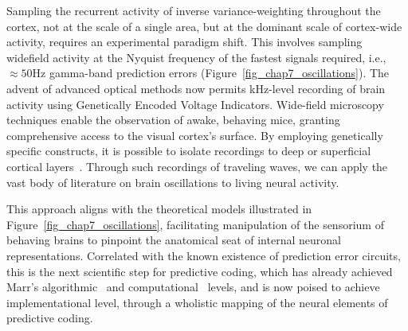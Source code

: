 Sampling the recurrent activity of inverse variance-weighting throughout the cortex, not at the scale of a single area, but at the dominant scale of cortex-wide activity, requires an experimental paradigm shift. This involves sampling widefield activity at the Nyquist frequency of the fastest signals required, i.e., $\approx 50$Hz gamma-band prediction errors (Figure~\ref{fig_chap7_oscillations}).
The advent of advanced optical methods now permits kHz-level recording of brain activity using Genetically Encoded Voltage Indicators. Wide-field microscopy techniques enable the observation of awake, behaving mice, granting comprehensive access to the visual cortex's surface. By employing genetically specific constructs, it is possible to isolate recordings to deep or superficial cortical layers~\cite{lu2023widefield}. Through such recordings of traveling waves, we can apply the vast body of literature on brain oscillations to living neural activity. 

This approach aligns with the theoretical models illustrated in Figure~\ref{fig_chap7_oscillations}, facilitating manipulation of the sensorium of behaving brains to pinpoint the anatomical seat of internal neuronal representations. Correlated with the known existence of prediction error circuits, this is the next scientific step for predictive coding, which has already achieved Marr's algorithmic~\cite{friston2005theory} and computational~\cite{sprevak2021predictive} levels, and is now poised to achieve implementational level, through a wholistic mapping of the neural elements of predictive coding.